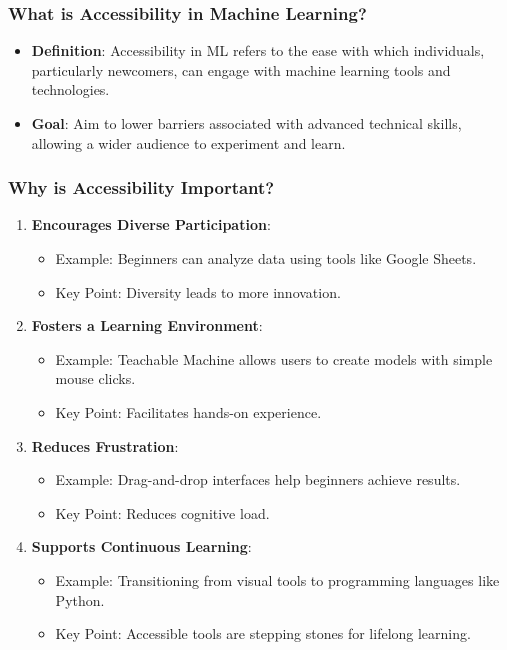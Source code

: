 \documentclass[aspectratio=169]{beamer}
\begin{document}
\begin{frame}[fragile]
    \frametitle{What is Accessibility in Machine Learning?}
    \begin{itemize}
        \item \textbf{Definition}:
        Accessibility in ML refers to the ease with which individuals, particularly newcomers, can engage with machine learning tools and technologies.
        
        \item \textbf{Goal}:
        Aim to lower barriers associated with advanced technical skills, allowing a wider audience to experiment and learn.
    \end{itemize}
\end{frame}

\begin{frame}[fragile]
    \frametitle{Why is Accessibility Important?}
    \begin{enumerate}
        \item \textbf{Encourages Diverse Participation}:
            \begin{itemize}
                \item Example: Beginners can analyze data using tools like Google Sheets.
                \item Key Point: Diversity leads to more innovation.
            \end{itemize}

        \item \textbf{Fosters a Learning Environment}:
            \begin{itemize}
                \item Example: Teachable Machine allows users to create models with simple mouse clicks.
                \item Key Point: Facilitates hands-on experience.
            \end{itemize}

        \item \textbf{Reduces Frustration}:
            \begin{itemize}
                \item Example: Drag-and-drop interfaces help beginners achieve results.
                \item Key Point: Reduces cognitive load.
            \end{itemize}

        \item \textbf{Supports Continuous Learning}:
            \begin{itemize}
                \item Example: Transitioning from visual tools to programming languages like Python.
                \item Key Point: Accessible tools are stepping stones for lifelong learning.
            \end{itemize}
    \end{enumerate}
\end{frame}
\end{document}
